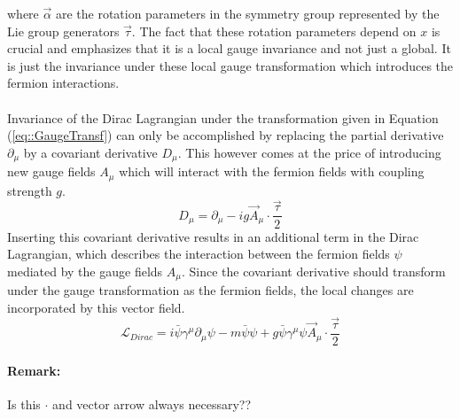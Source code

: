 where $\vec{\alpha}$ are the rotation parameters in the symmetry group represented by the Lie group generators $\vec{\tau}$. The fact that these rotation parameters depend on $x$ is crucial and emphasizes that it is a local gauge invariance and not just a global. It is just the invariance under these local gauge transformation which introduces the fermion interactions.
\\
\\
Invariance of the Dirac Lagrangian under the transformation given in Equation (\ref{eq::GaugeTransf}) can only be accomplished by replacing the partial derivative $\partial_{\mu}$ by a covariant derivative $D_{\mu}$. This however comes at the price of introducing new gauge fields $A_{\mu}$ which will interact with the fermion fields with coupling strength $g$.
\begin{equation} \label{eq::CovDer}
 D_{\mu} = \partial_{\mu} -i g \vec{A}_{\mu} \cdot \frac{\vec{\tau}}{2}
\end{equation}
Inserting this covariant derivative results in an additional term in the Dirac Lagrangian, which describes the interaction between the fermion fields $\psi$ mediated by the gauge fields $A_{\mu}$. 
Since the covariant derivative should transform under the gauge transformation as the fermion fields, the local changes are incorporated by this vector field.
\begin{equation} \label{eq::DiracLInter}
 \mathcal{L}_{Dirac} = i \bar{\psi} \gamma^{\mu} \partial_{\mu} \psi - m \bar{\psi} \psi + g \bar{\psi} \gamma^{\mu} \psi \vec{A}_{\mu} \cdot \frac{\vec{\tau}}{2}
\end{equation}
\paragraph{Remark: } Is this $\cdot$ and vector arrow always necessary??

